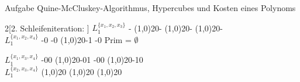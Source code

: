 \begin{frame}[allowframebreaks]{Aufgabe \thesection}{Quine-McCluskey-Algorithmus, Hypercubes und Kosten eines Polynoms}
    \begin{solutionnoinc}
        \begin{multicols*}{2}[2. Schleifeniteration: ]
          \tiny
            $L^{\{x_1,x_2,x_3\}}_1$ - \newline
            \line(1,0){20}- \newline
            \line(1,0){20}- \newline
            \line(1,0){20}- \\[0.5cm]
            $L^{\{x_1,x_2,x_4\}}_1$ -0 -0 \newline
            \line(1,0){20}-1 -0 \newline
            \newline Prim  = $\emptyset$

            \columnbreak
            $L^{\{x_1,x_3,x_4\}}_1$ -00 \newline
            \line(1,0){20}-01 -00 \newline
            \line(1,0){20}-10 \\[0.5cm]
            $L^{\{x_2,x_3,x_4\}}_1$  \newline
            \line(1,0){20} \newline
            \line(1,0){20} \newline
            \line(1,0){20} \newline
        \end{multicols*}

    \end{solutionnoinc}


\end{frame}
